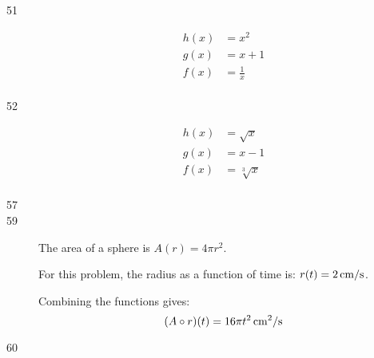 \documentclass{exam}
\begin{document}
\begin{description}
    \item[51]
      \begin{align*}
        h(x) &= x^2 \\
        g(x) &= x + 1 \\
        f(x) &= \frac{1}{x} \\
      \end{align*}

    \item[52]
      \begin{align*}
        h(x) &= \sqrt{x} \\
        g(x) &= x - 1 \\
        f(x) &= \sqrt[3]{x} \\
      \end{align*}

    \item[57]

    \item[59]
      The area of a sphere is $A(r) = 4 \pi r^2$.

      For this problem, the radius as a function of time is: $r(t) = \unit[2]{cm/s}$.

      Combining the functions gives: 
      \[
        (A \circ r)(t) = \unit[16 \pi t^2]{cm^2/s} 
      \]

    \pagebreak

    \item[60]
\end{description}
\end{document}
